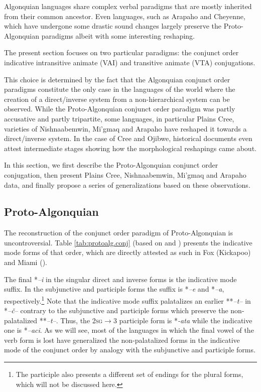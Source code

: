 \documentclass[twoside,a4paper,11pt]{article}
\newcommand{\ipa}[1]{{\phon\textit{#1}}}
\newcommand{\sg}{\textsc{sg}}
\newcommand{\Σ}{\greek{Σ}}
\begin{document}
Algonquian languages share complex verbal paradigms that are mostly inherited from their common ancestor. Even languages, such as Arapaho and Cheyenne, which have undergone some drastic sound changes largely preserve the Proto-Algonquian paradigms albeit with some interesting reshaping.

The present section focuses on two particular paradigms: the conjunct order indicative intransitive animate (VAI) and transitive animate (VTA) conjugations. 

This choice is determined by the fact that the Algonquian conjunct order paradigms constitute the only case in the languages of the world where the creation of a direct/inverse system from a non-hierarchical system can be observed. While the Proto-Algonquian conjunct order paradigm was partly accusative and partly tripartite, some languages, in particular Plains Cree, varieties of Nishnaabemwin, Mi'gmaq and  Arapaho have reshaped it towards a direct/inverse system. In the case of Cree and Ojibwe, historical documents even attest intermediate stages showing how the morphological reshapings came about.

In this section, we first describe the Proto-Algonquian conjunct order conjugation, then present Plains Cree, Nishnaabemwin, Mi'gmaq and Arapaho data, and finally propose a series of generalizations based on these observations.

\subsection{Proto-Algonquian}
The reconstruction of the conjunct order paradigm of Proto-Algonquian is uncontroversial. Table \ref{tab:protoalg.conj} (based on \citealt{bloomfield46proto} and \citealt{goddard00cheyenne}) presents the indicative mode forms of that order, which are directly attested as such in Fox (Kickapoo) and Miami (\citealt{costa03miami}).

The final *\ipa{--i} in the singular direct and inverse forms is the indicative mode suffix. In the subjunctive and participle forms the suffix is *\ipa{--e} and *\ipa{--a}, respectively.\footnote{The participle also presents a different set of endings for the plural forms, which will not be discussed here.} Note that the indicative mode suffix palatalizes an earlier **\ipa{--t--} in *\ipa{--č--} contrary to the subjunctive and participle forms which preserve the non-palatalized **\ipa{--t--}. Thus, the 2\sg$\rightarrow$3 participle form is *\ipa{-ata} while the indicative one is *\ipa{--aci}. As we will see, most of the languages in which the final vowel of the verb form is lost have generalized the non-palatalized forms in the indicative mode of the conjunct order by analogy with the subjunctive and participle forms.
\end{document}
